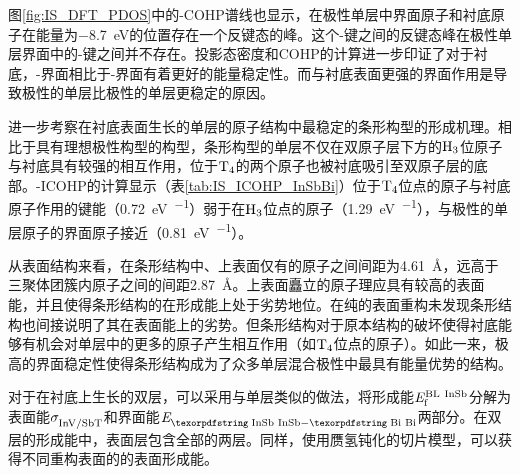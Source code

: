 图\ref{fig:IS_DFT_PDOS}中的-COHP谱线也显示，在极性单层中界面原子和衬底原子在能量为\SI{-8.7}{\electronvolt}的位置存在一个反键态的峰。这个-键之间的反键态峰在极性单层界面中的-键之间并不存在。投影态密度和COHP的计算进一步印证了对于衬底，-界面相比于-界面有着更好的能量稳定性。而与衬底表面更强的界面作用是导致极性的单层比极性的单层更稳定的原因。

进一步考察在衬底表面生长的单层的原子结构中最稳定的条形构型的形成机理。相比于具有理想极性构型的构型，条形构型的单层不仅在双原子层下方的$\rm H_{3} \it$位原子与衬底具有较强的相互作用，位于$\rm T_{4} \it$的两个原子也被衬底吸引至双原子层的底部。-ICOHP的计算显示（表\ref{tab:IS_ICOHP_InSbBi}）位于$\rm T_{4} \it$位点的原子与衬底原子作用的键能（\SI{0.72}{\electronvolt\per\pair}）弱于在$\rm H_{3} \it$位点的原子（\SI{1.29}{\electronvolt\per\pair}），与极性的单层原子的界面原子接近（\SI{0.81}{\electronvolt\per\pair}）。



从表面结构来看，在条形结构中、上表面仅有的原子之间间距为\SI{4.61}{\angstrom}，远高于三聚体团簇内原子之间的间距\SI{2.87}{\angstrom}。上表面矗立的原子理应具有较高的表面能，并且使得条形结构的在形成能上处于劣势地位。在纯的表面重构未发现条形结构也间接说明了其在表面能上的劣势。但条形结构对于原本结构的破坏使得衬底能够有机会对单层中的更多的原子产生相互作用（如$\rm T_{4} \it$位点的原子）。如此一来，极高的界面稳定性使得条形结构成为了众多单层混合极性中最具有能量优势的结构。

对于在衬底上生长的双层，可以采用与单层类似的做法，将形成能$\it E_{\rm f}^{\rm BL\ InSb} \it$分解为表面能$\it \sigma_{\rm InV/ SbT}^{\rm } \it$和界面能$\energyVar{\cemb{InSb}-\cemb{Bi}}{}$两部分。在双层的形成能中，表面层包含全部的两层。同样，使用赝氢钝化的切片模型，可以获得不同重构表面的的表面形成能。

